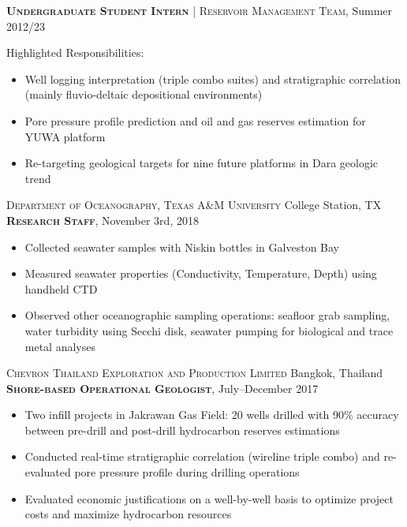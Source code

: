 \documentclass[10pt, letter]{article}
\newcommand{\margintext}[1]{\marginnote{\normalsize\textbf #1 |}}
\begin{document}
\textsc{\textbf{Undergraduate Student Intern}} | \textsc{Reservoir Management Team}, Summer 2012/23

\bigskip
Highlighted Responsibilities:
\begin{itemize}[leftmargin=*]
    \item Well logging interpretation (triple combo suites) and stratigraphic correlation (mainly fluvio-deltaic depositional environments)
    \item Pore pressure profile prediction and oil and gas reserves estimation for YUWA platform
    \item Re-targeting geological targets for nine future platforms in Dara geologic trend


\end{itemize}

\bigskip
\margintext{Cruise/Field Experience}
\textsc{Department of Oceanography, Texas A\&M University} \hfill College Station, TX \\
\textsc{\textbf{Research Staff}}, November 3rd, 2018 
\begin{itemize}[leftmargin=*]
    \item Collected seawater samples with Niskin bottles in Galveston Bay
    \item Measured seawater properties (Conductivity, Temperature, Depth) using handheld CTD 
    \item Observed other oceanographic sampling operations: seafloor grab sampling, water turbidity using Secchi disk, seawater pumping for biological and trace metal analyses
\end{itemize}  

\bigskip
\textsc{Chevron Thailand Exploration and Production Limited} \hfill Bangkok, Thailand \\
\textsc{\textbf{Shore-based Operational Geologist}}, July–December 2017
\begin{itemize}[leftmargin=*]
    \item Two infill projects in Jakrawan Gas Field: 20 wells drilled with 90\% accuracy between pre-drill and post-drill hydrocarbon reserves estimations
    \item Conducted real-time stratigraphic correlation (wireline triple combo) and re-evaluated pore pressure profile during drilling operations
    \item Evaluated economic justifications on a well-by-well basis to optimize project costs and maximize hydrocarbon resources
\end{itemize} 
\end{document}

